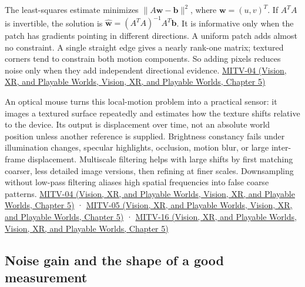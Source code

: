 The least-squares estimate minimizes \(\|A\mathbf{w}-\mathbf{b}\|^2\), where \(\mathbf{w}=(u,v)^T\). If \(A^TA\) is invertible, the solution is \(\hat{\mathbf{w}}=(A^TA)^{-1}A^T\mathbf{b}\). It is informative only when the patch has gradients pointing in different directions. A uniform patch adds almost no constraint. A single straight edge gives a nearly rank-one matrix; textured corners tend to constrain both motion components. So adding pixels reduces noise only when they add independent directional evidence. \href{../07-Vision-XR-and-Playable-Worlds/main.pdf\#nameddest=04-visual-computing-ii-ch036-mitv-04---fixed-optical-flow-optical-mouse-constant-brightness-assumption-closed-form-solution}{MITV-04 (Vision, XR, and Playable Worlds, Vision, XR, and Playable Worlds, Chapter 5)}

An optical mouse turns this local-motion problem into a practical sensor: it images a textured surface repeatedly and estimates how the texture shifts relative to the device. Its output is displacement over time, not an absolute world position unless another reference is supplied. Brightness constancy fails under illumination changes, specular highlights, occlusion, motion blur, or large inter-frame displacement. Multiscale filtering helps with large shifts by first matching coarser, less detailed image versions, then refining at finer scales. Downsampling without low-pass filtering aliases high spatial frequencies into false coarse patterns. \href{../07-Vision-XR-and-Playable-Worlds/main.pdf\#nameddest=04-visual-computing-ii-ch036-mitv-04---fixed-optical-flow-optical-mouse-constant-brightness-assumption-closed-form-solution}{MITV-04 (Vision, XR, and Playable Worlds, Vision, XR, and Playable Worlds, Chapter 5)} · \href{../07-Vision-XR-and-Playable-Worlds/main.pdf\#nameddest=04-visual-computing-ii-ch036-mitv-05---tcc-and-for-montivision-demos-vanishing-point-use-of-vps-in-camera-calibration}{MITV-05 (Vision, XR, and Playable Worlds, Vision, XR, and Playable Worlds, Chapter 5)} · \href{../07-Vision-XR-and-Playable-Worlds/main.pdf\#nameddest=04-visual-computing-ii-ch036-mitv-16---fast-convolution-low-pass-filter-approximations-integral-images-us-6457032}{MITV-16 (Vision, XR, and Playable Worlds, Vision, XR, and Playable Worlds, Chapter 5)}

\subsection{Noise gain and the shape of a good measurement}\label{04-visual-computing-ii-ch030-noise-gain-and-the-shape-of-a-good-measurement}

